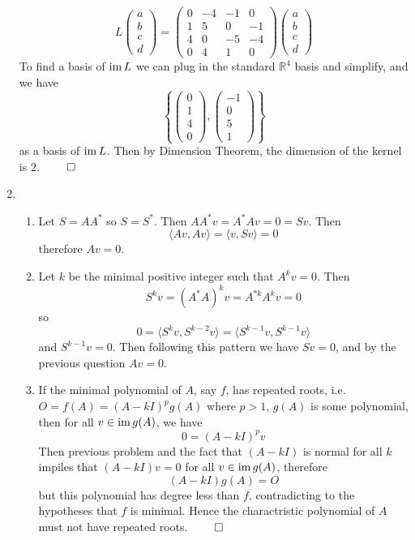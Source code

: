 \begin{enumerate}
    \[
    L\begin{pmatrix} a \\ b \\ c \\ d \end{pmatrix} = 
    \begin{pmatrix} 
    0&-4&-1&0\\1&5&0&-1\\4&0&-5&-4\\0&4&1&0
    \end{pmatrix}
    \begin{pmatrix} a \\ b \\ c \\ d \end{pmatrix}
    \]
    To find a basis of $\operatorname{im} L$ we can plug in the standard $\mathbb{R}^4$ basis and simplify, and we have
    \[
    \left\{ \begin{pmatrix} 0\\1\\4\\0 \end{pmatrix}, \begin{pmatrix} -1\\0\\5\\1 \end{pmatrix} \right\}
    \]
    as a basis of $\operatorname{im} L$. Then by Dimension Theorem, the dimension of the kernel is $2$. $\qed$
    \item
    \begin{enumerate}[label=(\arabic*)]
        \item Let $S = AA^*$ so $S = S^*$. Then $AA^*v = A^*Av = 0 = Sv$. Then 
        \[
        \langle Av, Av \rangle = \langle v, Sv \rangle = 0
        \]
        therefore $Av = 0$.
        \item Let $k$ be the minimal positive integer such that $A^kv = 0$. Then
        \[
        S^kv = (A^*A)^kv = A^{*k}A^kv = 0
        \]
        so
        \[
        0 = \langle S^kv, S^{k-2}v \rangle = \langle S^{k-1}v, S^{k-1}v \rangle
        \]
        and $S^{k-1}v = 0$. Then following this pattern we have $Sv = 0$, and by the previous question $Av = 0$.
        \item If the minimal polynomial of $A$, say $f$, has repeated roots, i.e. $O = f(A) = (A-kI)^p g(A)$ where $p>1$, $g(A)$ is some polynomial, then for all  $v \in \operatorname{im} g(A)$, we have
        \[
        0 = (A-kI)^p v
        \]
        Then previous problem and the fact that $(A-kI)$ is normal for all $k$ impiles that $(A-kI)v = 0$ for all $v \in \operatorname{im} g(A)$, therefore
        \[
        (A - kI)g(A) = O
        \]
        but this polynomial has degree less than $f$, contradicting to the hypotheses that $f$ is minimal. Hence the charactristic polynomial of $A$ must not have repeated roots. $\qed$
    \end{enumerate}
\end{enumerate}